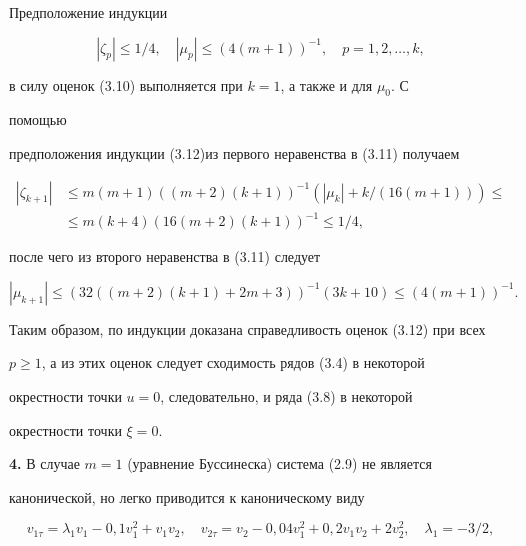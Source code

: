 Предположение индукции 


\begin{equation} 


|\zeta_p|\le 1/4,\quad |\mu_p|\le(4(m+1))^{-1},\quad 


p=1,2,\dotsc,k, 


\end{equation} 


в силу оценок (3.10) выполняется при $k=1$, а также и для $\mu_0$. С 


помощью 


предположения индукции (3.12)из первого неравенства в (3.11) получаем 


\begin{align*} 


|\zeta_{k+1}|&\le m(m+1)((m+2)(k+1))^{-1}(|\mu_k|+k/ 


(16(m+1)))\le \\ 


&\le m(k+4)(16(m+2)(k+1))^{-1}\le 1/4, 


\end{align*} 


после чего из второго неравенства в (3.11) следует 


$$ 


|\mu_{k+1}|\le(32((m+2)(k+1)+2m+3))^{-1}(3k+10) 


\le(4(m+1))^{-1}. 


$$ 


Таким образом, по индукции доказана справедливость оценок (3.12) при всех 


$p\ge1$, а из этих оценок следует сходимость рядов (3.4) в некоторой 


окрестности точки $u=0$, следовательно, и ряда (3.8) в некоторой 


окрестности точки $\xi=0$. 


\medskip 


\addtocounter{section}{1} 


\setcounter{equation}{0}


 


{\bf 4.} В случае $m=1$ (уравнение Буссинеска) система (2.9) не является 


канонической, но легко приводится к каноническому виду 


\begin{equation} 


v_{1\tau}=\lambda_1v_1-0{,}1v^2_1+v_1v_2,\quad 


v_{2\tau}=v_2-0{,}04v^2_1+0{,}2v_1v_2+2v^2_2,\quad 


\lambda_1=-3/2,


\end{equation} 


